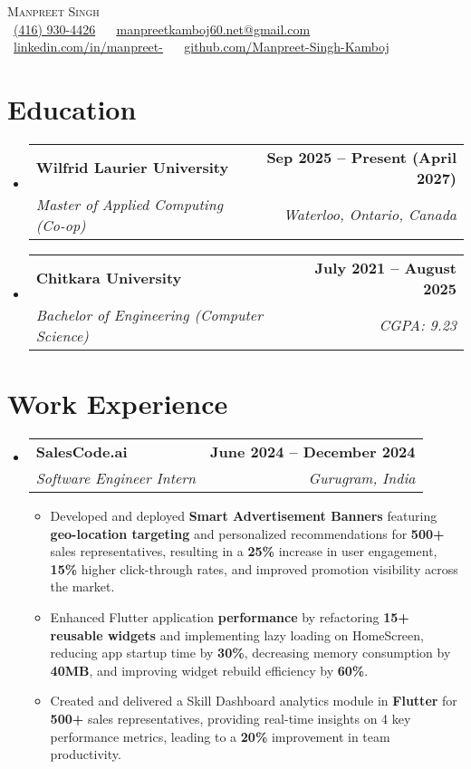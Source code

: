 \documentclass[letterpaper,11pt]{article}
\makeatletter
\newcommand{\resumeItem}[1]{
  \item\small{
    {#1 \vspace{0pt}}
  }
}
\newcommand{\resumeSubheading}[4]{
  \vspace{-2pt}\item
    \begin{tabular*}{1.0\textwidth}[t]{l@{\extracolsep{\fill}}r}
      \textbf{#1} & \textbf{\small #2} \\
      \textit{\small#3} & \textit{\small #4} \\
    \end{tabular*}\vspace{-7pt}
}
\newcommand{\resumeSubHeadingListStart}{\begin{itemize}[leftmargin=0.0in, label={}]}
\newcommand{\resumeSubHeadingListEnd}{\end{itemize}}\vspace{0pt}
\newcommand{\resumeItemListStart}{\begin{itemize}}
\newcommand{\resumeItemListEnd}{\end{itemize}\vspace{-5pt}}
\makeatother
\begin{document}
\begin{center}
    {\Large \scshape Manpreet Singh} \\[2mm]
    \footnotesize \raisebox{-0.1\height}
    \faPhone\ \underline{(416) 930-4426} ~ 
    {\faEnvelope\  \underline{\href{mailto:manpreetkamboj60.net@gmail.com} {manpreetkamboj60.net@gmail.com}}} ~ 
    {\faLinkedin\ \underline{\href{www.linkedin.com/in/manpreet-/}{linkedin.com/in/manpreet-}}}  ~
    {\faGithub\ \underline{\href{https://github.com/Manpreet-Singh-Kamboj}{github.com/Manpreet-Singh-Kamboj}}} ~
    \vspace{-5pt}
\end{center}

\section{Education}
    \resumeSubHeadingListStart
    \resumeSubheading
      {Wilfrid Laurier University}{Sep 2025 -- Present (April 2027)}
      {{\normalfont Master of Applied Computing (Co-op)}}
  {{\normalfont Waterloo, Ontario, Canada}}
  \resumeSubHeadingListEnd
    \vspace{-10pt}
  \resumeSubHeadingListStart
    \resumeSubheading
      {Chitkara University}{July 2021 -- August 2025}
      {\normalfont Bachelor of Engineering (Computer Science)}{\normalfont CGPA: 9.23}
  \resumeSubHeadingListEnd
    \vspace{-9.5pt}
\section{Work Experience}
\vspace{3pt}
\resumeSubHeadingListStart
  \resumeSubheading{SalesCode.ai}{June 2024 -- December 2024}{Software Engineer Intern}{Gurugram, India} 
  \resumeItemListStart
    \resumeItem{Developed and deployed \textbf{Smart Advertisement Banners} featuring \textbf{geo-location targeting} and personalized recommendations for \textbf{500+} sales representatives, resulting in a \textbf{25\%} increase in user engagement, \textbf{15\%} higher click-through rates, and improved promotion visibility across the market.}
    \resumeItem{Enhanced Flutter application \textbf{performance} by refactoring \textbf{15+ reusable widgets} and implementing lazy loading on HomeScreen, reducing app startup time by \textbf{30\%}, decreasing memory consumption by \textbf{40MB}, and improving widget rebuild efficiency by \textbf{60\%}.}
    \resumeItem{Created and delivered a Skill Dashboard analytics module in \textbf{Flutter} for \textbf{500+} sales representatives, providing real-time insights on 4 key performance metrics, leading to a \textbf{20\%} improvement in team productivity.}
  \resumeItemListEnd
\resumeSubHeadingListEnd
\vspace{-15pt}
\end{document}
